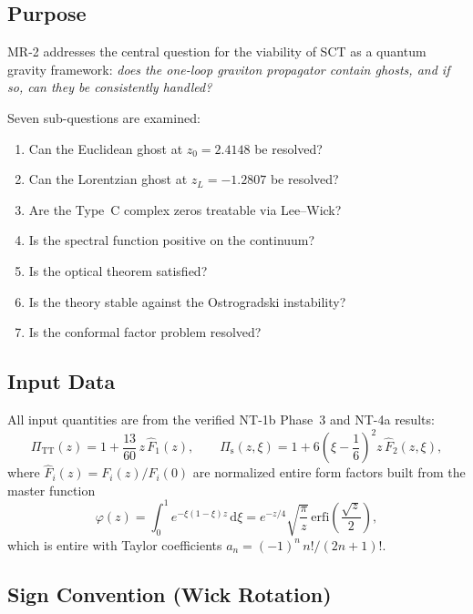 \documentclass[11pt,a4paper]{article}
\newcommand{\dd}{\mathrm{d}}
\newcommand{\PiTT}{\Pi_{\mathrm{TT}}}
\newcommand{\Pis}{\Pi_{\mathrm{s}}}
\newcommand{\Fhat}{\hat{F}}
\begin{document}
\subsection{Purpose}

MR-2 addresses the central question for the viability of SCT as a
quantum gravity framework: \emph{does the one-loop graviton propagator
contain ghosts, and if so, can they be consistently handled?}

Seven sub-questions are examined:
\begin{enumerate}[label=\textbf{Q\arabic*}:, leftmargin=4em]
  \item Can the Euclidean ghost at $z_0 = 2.4148$ be resolved?
  \item Can the Lorentzian ghost at $z_L = -1.2807$ be resolved?
  \item Are the Type~C complex zeros treatable via Lee--Wick?
  \item Is the spectral function positive on the continuum?
  \item Is the optical theorem satisfied?
  \item Is the theory stable against the Ostrogradski instability?
  \item Is the conformal factor problem resolved?
\end{enumerate}

\subsection{Input Data}

All input quantities are from the verified NT-1b Phase~3 and NT-4a
results:
\begin{equation}\label{eq:PiTT}
  \PiTT(z) = 1 + \frac{13}{60}\,z\,\Fhat_1(z),
  \qquad
  \Pis(z,\xi) = 1 + 6\!\left(\xi - \frac{1}{6}\right)^{\!2} z\,\Fhat_2(z,\xi),
\end{equation}
where $\Fhat_i(z) = F_i(z)/F_i(0)$ are normalized entire form factors
built from the master function
\begin{equation}\label{eq:phi}
  \varphi(z)
  = \int_0^1 e^{-\xi(1-\xi)z}\,\dd\xi
  = e^{-z/4}\sqrt{\frac{\pi}{z}}\,\mathrm{erfi}\!\left(\frac{\sqrt{z}}{2}\right),
\end{equation}
which is entire with Taylor coefficients
$a_n = (-1)^n\,n!/(2n+1)!$.

\subsection{Sign Convention (Wick Rotation)}
\label{sec:wick}
\end{document}
